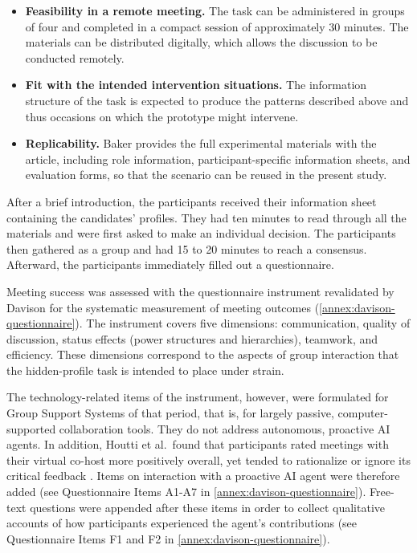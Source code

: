 \begin{itemize}
  \item \textbf{Feasibility in a remote meeting.}
    The task can be administered in groups of four and completed in a compact session of
    approximately 30 minutes.
    The materials can be distributed digitally, which allows the discussion to be conducted
    remotely.
  \item \textbf{Fit with the intended intervention situations.}
    The information structure of the task is expected to produce the patterns described above
    and thus occasions on which the prototype might intervene.
  \item \textbf{Replicability.}
    Baker provides the full experimental materials with the article, including role information,
    participant-specific information sheets, and evaluation forms, so that the scenario can be
    reused in the present study.
\end{itemize}

After a brief introduction, the participants received their information sheet containing the candidates’
profiles. They had ten minutes to read through all the materials and were first asked to make an individual
decision. The participants then gathered as a group and had 15 to 20 minutes to reach a consensus. Afterward,
the participants immediately filled out a questionnaire.

Meeting success was assessed with the questionnaire instrument revalidated by Davison for the
systematic measurement of meeting outcomes
\cite{davisonInstrumentMeasuringMeeting1999}
(\autoref{annex:davison-questionnaire}).
The instrument covers five dimensions: communication, quality of discussion, status effects
(power structures and hierarchies), teamwork, and efficiency.
These dimensions correspond to the aspects of group interaction that the hidden-profile task is
intended to place under strain.

The technology-related items of the instrument, however, were formulated for Group Support
Systems of that period, that is, for largely passive, computer-supported collaboration tools.
They do not address autonomous, proactive AI agents.
In addition, Houtti et al.\ found that participants rated meetings with their virtual co-host
more positively overall, yet tended to rationalize or ignore its critical feedback
\cite{houttiObserveAskIntervene2025}.
Items on interaction with a proactive AI agent were therefore added
(see Questionnaire Items A1-A7 in \autoref{annex:davison-questionnaire}).
Free-text questions were appended after these items in order to collect
qualitative accounts of how participants experienced the agent's contributions
(see Questionnaire Items F1 and F2 in \autoref{annex:davison-questionnaire}).

